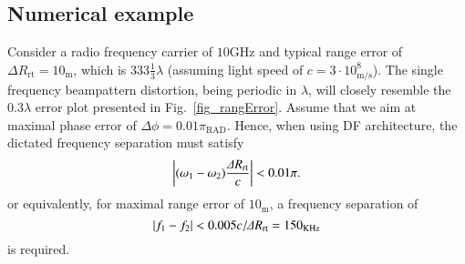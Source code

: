 \subsection*{Numerical example}
Consider a radio frequency carrier of $10\text{GHz}$ and typical range error of $\Delta{}R_{\text{rt}}=10_{\text{m}}$, which is $333\frac{1}{3}\lambda$ (assuming light speed of $c=3\cdot 10^{8}_{\text{m/s}}$). The single frequency beampattern distortion, being periodic in $\lambda$, will closely resemble the $0.3\lambda$ error plot presented in Fig.~\ref{fig_rangError}. Assume that we aim at maximal phase error of $\Delta \phi=0.01\pi_{\text{RAD}}$. Hence, when using DF architecture, the dictated frequency separation must satisfy
\begin{equation}\label{eq_DF_phErr}
\abs{(\omega_1-\omega_2)\frac{\Delta{}R_{\text{rt}}}{c}}<0.01\pi.
\end{equation}
or equivalently, for maximal range error of $10_\text{m}$, a frequency separation of
\[
\left\vert f_1-f_2\right\vert<0.005 c/\Delta{}R_{\text{rt}}=150_{\text{KHz}}
\]
is required. 

